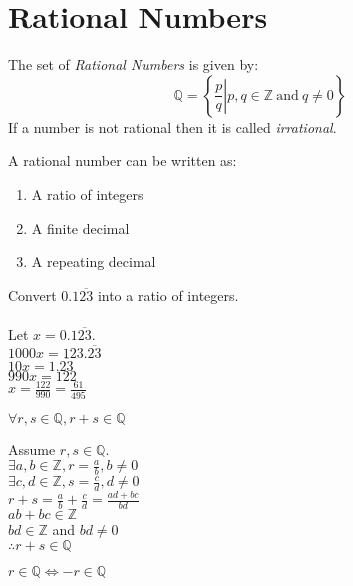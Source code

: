 \documentclass[letterpaper,12pt,fleqn]{article}
\begin{document}
\section*{Rational Numbers}

\begin{definition}
The set of \emph{Rational Numbers} is given by:
\[\mathbb{Q}=\left\{\left.\frac{p}{q}\right|
    p,q\in\mathbb{Z}\ \mbox{and}\ q\ne0\right\}\]
If a number is not rational then it is called \emph{irrational}.
\end{definition}

\begin{properties}
A rational number can be written as:
\begin{enumerate}
\item{A ratio of integers}
\item{A finite decimal}
\item{A repeating decimal}
\end{enumerate}
\end{properties}

\begin{example}
Convert $0.1\overline{23}$ into a ratio of integers. \\
\\
Let $x=0.1\overline{23}$. \\
$1000x=123.\overline{23}$ \\
$10x=1.\overline{23}$ \\
$990x=122$ \\
$x=\frac{122}{990}=\frac{61}{495}$
\end{example}

\begin{theorem}
$\forall r,s\in\mathbb{Q},r+s\in\mathbb{Q}$
\end{theorem}

\begin{theproof}
Assume $r,s\in\mathbb{Q}$. \\
$\exists a,b\in\mathbb{Z},r=\frac{a}{b}, b\ne0$ \\
$\exists c,d\in\mathbb{Z},s=\frac{c}{d}, d\ne0$ \\
$r+s=\frac{a}{b}+\frac{c}{d}=\frac{ad+bc}{bd}$ \\
$ab+bc\in\mathbb{Z}$ \\
$bd\in\mathbb{Z}$ and $bd\ne0$ \\
$\therefore r+s\in\mathbb{Q}$ \\
\end{theproof}

\begin{lemma}
$r\in\mathbb{Q}\iff -r\in\mathbb{Q}$
\end{lemma}
\end{document}
